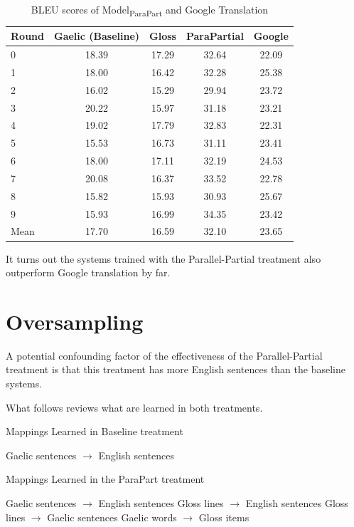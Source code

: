 \documentclass[final]{ua-thesis}
\numberwithin{equation}{section}
\begin{document}
\begin{table}[ht]
\centering
\begin{tabular}{lcccc}
  \hline
Round & Gaelic (Baseline) & Gloss & ParaPartial & Google \\ 
  \hline
0 & 18.39 & 17.29 & 32.64 & 22.09 \\ 
  1 & 18.00 & 16.42 & 32.28 & 25.38 \\ 
  2 & 16.02 & 15.29 & 29.94 & 23.72 \\ 
  3 & 20.22 & 15.97 & 31.18 & 23.21 \\ 
  4 & 19.02 & 17.79 & 32.83 & 22.31 \\ 
  5 & 15.53 & 16.73 & 31.11 & 23.41 \\ 
  6 & 18.00 & 17.11 & 32.19 & 24.53 \\ 
  7 & 20.08 & 16.37 & 33.52 & 22.78 \\ 
  8 & 15.82 & 15.93 & 30.93 & 25.67 \\ 
  9 & 15.93 & 16.99 & 34.35 & 23.42 \\ 
   \hline
Mean & 17.70 & 16.59 & 32.10 & 23.65 \\ 
   \hline
\end{tabular}
\caption{BLEU scores of Model\textsubscript{ParaPart} and Google Translation} 
\label{Table:google}
\end{table}
It turns out the systems trained with the Parallel-Partial treatment also outperform Google translation by far.   

\section{Oversampling}
A potential confounding factor of the effectiveness of the Parallel-Partial treatment is that this treatment has more English sentences than the baseline systems. 

What follows reviews what are learned in both treatments.

\begin{exe}
	\ex Mappings Learned in Baseline treatment
	\begin{xlist}
		\ex Gaelic sentences $\rightarrow$ English sentences
	\end{xlist}	
	\ex Mappings Learned in the ParaPart treatment
	\begin{xlist}
		\ex \label{over1} Gaelic sentences $\rightarrow$ English sentences
		\ex \label{over2} Gloss lines $\rightarrow$ English sentences
		\ex Gloss lines $\rightarrow$ Gaelic sentences
		\ex Gaelic words $\rightarrow$ Gloss items
	\end{xlist}	
\end{exe}    
\end{document}
